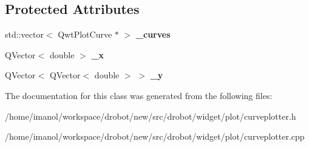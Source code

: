 \subsection*{Protected Attributes}
\begin{DoxyCompactItemize}
\item 
\hypertarget{classdrobot_1_1widget_1_1plot_1_1CurvePlotter_ac3acbd04f9ea1cfcf4899f63f7fba291}{std\-::vector$<$ Qwt\-Plot\-Curve $\ast$ $>$ {\bfseries \-\_\-curves}}\label{classdrobot_1_1widget_1_1plot_1_1CurvePlotter_ac3acbd04f9ea1cfcf4899f63f7fba291}

\item 
\hypertarget{classdrobot_1_1widget_1_1plot_1_1CurvePlotter_aea298c6b1e466cee1ef833e748f80227}{Q\-Vector$<$ double $>$ {\bfseries \-\_\-x}}\label{classdrobot_1_1widget_1_1plot_1_1CurvePlotter_aea298c6b1e466cee1ef833e748f80227}

\item 
\hypertarget{classdrobot_1_1widget_1_1plot_1_1CurvePlotter_a9bb29d62a0f9f225ca86e7501084f99e}{Q\-Vector$<$ Q\-Vector$<$ double $>$ $>$ {\bfseries \-\_\-y}}\label{classdrobot_1_1widget_1_1plot_1_1CurvePlotter_a9bb29d62a0f9f225ca86e7501084f99e}

\end{DoxyCompactItemize}


The documentation for this class was generated from the following files\-:\begin{DoxyCompactItemize}
\item 
/home/imanol/workspace/drobot/new/src/drobot/widget/plot/curveplotter.\-h\item 
/home/imanol/workspace/drobot/new/src/drobot/widget/plot/curveplotter.\-cpp\end{DoxyCompactItemize}
